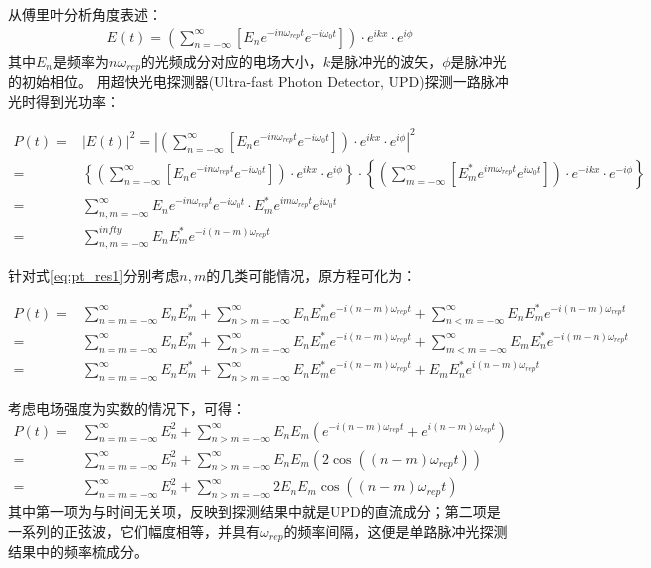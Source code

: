 从傅里叶分析角度表述：
\begin{align}
    E(t)=\left(\sum_{n=-\infty}^{\infty}\left[E_n e^{-in\omega_{rep}t} e^{-i\omega_0 t} \right]\right)\cdot e^{ikx}\cdot e^{i\phi}
\end{align}
其中$E_n$是频率为$n\omega_{rep}$的光频成分对应的电场大小，$k$是脉冲光的波矢，$\phi$是脉冲光的初始相位。
用超快光电探测器(Ultra-fast Photon Detector, UPD)探测一路脉冲光时得到光功率：
\begin{footnotesize}
\begin{align}
    P(t)=&|E(t)|^2=\left|\left(\sum_{n=-\infty}^{\infty}\left[E_n e^{-in\omega_{rep}t} e^{-i\omega_0 t} \right]\right)\cdot e^{ikx}\cdot e^{i\phi}\right|^2\\
    =&\left\{\left(\sum_{n=-\infty}^{\infty}\left[E_n e^{-in\omega_{rep}t} e^{-iω_0 t} \right]\right)\cdot e^{ikx}\cdot e^{i\phi}\right\} \cdot\left\{\left(\sum_{m=-\infty}^{\infty}\left[E^*_m e^{im\omega_{rep}t} e^{i\omega_0 t} \right]\right)\cdot e^{-ikx}\cdot e^{-i\phi}\right\}\\
    =&\sum_{n,m=-\infty}^{\infty}E_n e^{-in\omega_{rep} t} e^{-i\omega_0 t}\cdot E_m^* e^{im\omega_{rep} t} e^{i\omega_0 t}\\
    =&\sum_{n,m=-\infty}^{infty}E_n E_m^* e^{-i(n-m) \omega_{rep} t}\label{eq:pt_res1}
\end{align}    
\end{footnotesize}

针对式\eqref{eq:pt_res1}分别考虑$n,m$的几类可能情况，原方程可化为：
\begin{footnotesize}
\begin{align}
    P(t)=&\sum_{n=m=-\infty}^{\infty}E_n E_m^*
    +\sum_{n>m=-\infty}^{\infty}E_n E_m^*e^{-i(n-m)\omega_{rep}t}+\sum_{n<m=-\infty}^{\infty}E_n E_m^*e^{-i(n-m)\omega_{rep}t}\\
    =&\sum_{n=m=-\infty}^{\infty}E_n E_m^*
    +\sum_{n>m=-\infty}^{\infty}E_n E_m^*e^{-i(n-m)\omega_{rep}t}+\sum_{m<m=-\infty}^{\infty}E_m E_n^*e^{-i(m-n)\omega_{rep}t}\\
    =&\sum_{n=m=-\infty}^{\infty}E_n E_m^*+\sum_{n>m=-\infty}^{\infty}E_n E_m^*e^{-i(n-m)\omega_{rep}t}+E_mE_n^* e^{i(n-m)\omega_{rep}t}
\end{align}
\end{footnotesize}

考虑电场强度为实数的情况下，可得：
\begin{align}
    P(t)=&\sum_{n=m=-\infty}^{\infty}E_n^2 + \sum_{n>m=-\infty}^{\infty}E_n E_m\left(e^{-i(n-m)\omega_{rep}t}+e^{i(n-m)\omega_{rep}t}\right)\\
    =&\sum_{n=m=-\infty}^{\infty}E_n^2 + \sum_{n>m=-\infty}^{\infty}E_n E_m\left(2\cos\left((n-m)\omega_{rep}t\right)\right)\\
    =&\sum_{n=m=-\infty}^{\infty}E_n^2 + \sum_{n>m=-\infty}^{\infty}2E_n E_m \cos\left((n-m)\omega_{rep}t\right)\label{eq:pt_res2}
\end{align}
其中第一项为与时间无关项，反映到探测结果中就是UPD的直流成分；第二项是一系列的正弦波，它们幅度相等，并具有$\omega_{rep}$的频率间隔，这便是单路脉冲光探测结果中的频率梳成分。


